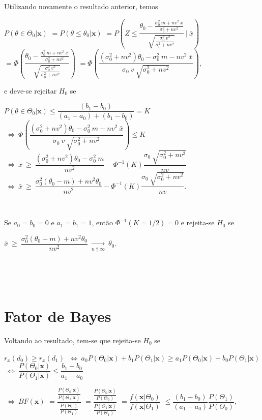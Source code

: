 \documentclass[
]{book}
\begin{document}
Utilizando novamente o resultado anterior, temos

\(P\left(\theta\in\Theta_0|\boldsymbol x\right)\)
\(= P\left(\theta \leq \theta_0|\boldsymbol x\right)\)
\(= P\left(Z\leq\dfrac{\theta_0-\frac{{\sigma}_0^2~m+nv^2~\bar x}{{\sigma}_0^2+nv^2}}{\sqrt{\frac{{\sigma}_0^2~v^2}{{\sigma}_0^2+nv^2}}}~\Bigg|~\bar x\right)\)
\(= \Phi\left(\dfrac{\theta_0-\frac{{\sigma}_0^2~m+nv^2~\bar x}{{\sigma}_0^2+nv^2}}{\sqrt{\frac{{\sigma}_0^2~v^2}{{\sigma}_ 0^2+nv^2}}}\right)\)
\(= \Phi\left(\dfrac{({\sigma}_0^2+nv^2)\theta_0-{\sigma}_0^2~m-nv^2~\bar x}{{\sigma}_0~v~\sqrt{{\sigma}_ 0^2+nv^2}}\right)\),

e deve-se rejeitar \(H_0\) se

\(P\left(\theta\in\Theta_0|\boldsymbol x\right) \leq \dfrac{(b_1-b_0)}{(a_1-a_0)+(b_1-b_0)} = K\)
\(~\Longleftrightarrow~\Phi\left(\dfrac{({\sigma}_0^2+nv^2)\theta_0-{\sigma}_0^2~m-nv^2~\bar x}{{\sigma}_0~v~\sqrt{{\sigma}_ 0^2+nv^2}}\right) \leq K\)
\(~\Longleftrightarrow~ \bar x ~\geq~ \dfrac{({\sigma}_0^2+nv^2)\theta_0-{\sigma}_0^2~m}{nv^2} - {\Phi}^{-1}(K)\dfrac{{\sigma}_0~\sqrt{{\sigma}_ 0^2+nv^2}}{nv}\)
\(~\Longleftrightarrow~ \bar x ~\geq~ \dfrac{{\sigma}_0^2(\theta_0-m)+nv^2\theta_0}{nv^2} - {\Phi}^{-1}(K)\dfrac{{\sigma}_0~\sqrt{{\sigma}_ 0^2+nv^2}}{nv}\).

\(~\)

Se \(a_0=b_0=0\) e \(a_1=b_1=1\), então \(\Phi^{-1}(K=1/2)=0\) e rejeita-se \(H_0\) se

\(\bar x ~\geq~ \dfrac{{\sigma}_0^2(\theta_0-m)+nv^2\theta_0}{nv^2} ~\underset{n\uparrow\infty}{\longrightarrow}~ \theta_0\).

\(~\)

\(~\)

\hypertarget{fator-de-bayes}{%
\section{Fator de Bayes}\label{fator-de-bayes}}

Voltando ao resultado, tem-se que rejeita-se \(H_0\) se

\(r_x(d_0) \geq r_x(d_1)\)
\(~\Longleftrightarrow~ a_0P(\Theta_0|\boldsymbol x)+b_1P(\Theta_1|\boldsymbol x) \geq a_1P(\Theta_0|\boldsymbol x)+b_0P(\Theta_1|\boldsymbol x)\)
\(~\Longleftrightarrow~ \dfrac{P(\Theta_0|\boldsymbol x)}{P(\Theta_1|\boldsymbol x)}\leq\dfrac{b_1-b_0}{a_1-a_0}\)

\(~\Longleftrightarrow~ BF(\boldsymbol x)\) \(=\dfrac{\frac{P(\Theta_0|\boldsymbol x)}{P(\Theta_1|\boldsymbol x)}}{\frac{P(\Theta_0)}{P(\Theta_1)}}\) \(=\dfrac{\frac{P(\Theta_0|\boldsymbol x)}{P(\Theta_0)}}{\frac{P(\Theta_1|\boldsymbol x)}{P(\Theta_1)}}\)
\(=\dfrac{f(\boldsymbol x | \Theta_0)}{f(\boldsymbol x | \Theta_1)}\)
\(\leq \dfrac{(b_1-b_0)}{(a_1-a_0)}\dfrac{P(\Theta_1)}{P(\Theta_0)}\),
\end{document}
